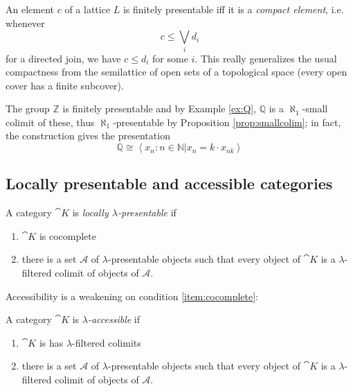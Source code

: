 \begin{Example}
An element $c$ of a lattice $L$ is finitely presentable iff it is a \emph{compact element}, i.e. whenever
\[ c \leq \bigvee_i d_i \]
for a directed join, we have $c \leq d_i$ for some $i$. This really generalizes the usual compactness from the semilattice of open sets of a topological space (every open cover has a finite subcover).
\end{Example}
\begin{Example}
The group $\mathbb Z$ is finitely presentable and by Example \ref{ex:Q}, $\mathbb Q$ is a $\aleph_1$-small colimit of these, thus $\aleph_1$-presentable by Proposition \ref{prop:smallcolim}; in fact, the construction gives the presentation
\[ \mathbb Q \cong \left\langle x_n : n \in \mathbb N | x_n = k \cdot x_{nk} \right \rangle\]
\end{Example}

\subsection{Locally presentable and accessible categories}


\begin{Definition}
A category $\cat K$ is \emph{locally $\lambda$-presentable} if
\begin{enumerate}
\item $\cat K$ is cocomplete \label{item:cocomplete}
\item there is a set $\mathcal A$ of $\lambda$-presentable objects such that every object of $\cat K$ is a $\lambda$-filtered colimit of objects of $\mathcal A$.
\end{enumerate}
\end{Definition}

Accessibility is a weakening on condition \ref{item:cocomplete}:

\begin{Definition}
A category $\cat K$ is \emph{$\lambda$-accessible} if
\begin{enumerate}
\item $\cat K$ is has $\lambda$-filtered colimits
\item there is a set $\mathcal A$ of $\lambda$-presentable objects such that every object of $\cat K$ is a $\lambda$-filtered colimit of objects of $\mathcal A$.
\end{enumerate}
\end{Definition}

